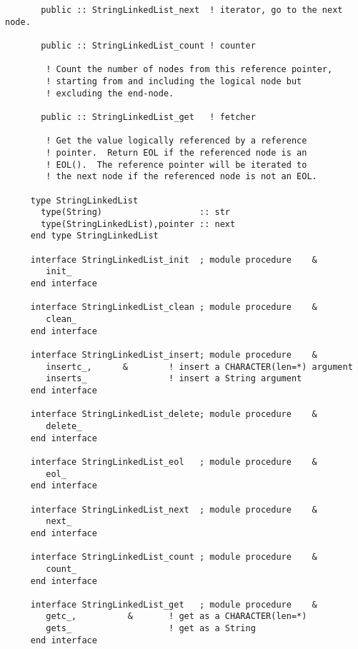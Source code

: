 \begin{verbatim}
       public :: StringLinkedList_next	! iterator, go to the next node.
 
       public :: StringLinkedList_count	! counter
       
 		! Count the number of nodes from this reference pointer,
 		! starting from and including the logical node but
 		! excluding the end-node.
 
       public :: StringLinkedList_get	! fetcher
 
 		! Get the value logically referenced by a reference
 		! pointer.  Return EOL if the referenced node is an
 		! EOL().  The reference pointer will be iterated to
 		! the next node if the referenced node is not an EOL.
 
     type StringLinkedList
       type(String)                   :: str
       type(StringLinkedList),pointer :: next
     end type StringLinkedList
 
     interface StringLinkedList_init  ; module procedure	&
        init_
     end interface
 
     interface StringLinkedList_clean ; module procedure	&
        clean_
     end interface
 
     interface StringLinkedList_insert; module procedure	&
        insertc_,      &        ! insert a CHARACTER(len=*) argument
        inserts_                ! insert a String argument
     end interface
 
     interface StringLinkedList_delete; module procedure	&
        delete_
     end interface
 
     interface StringLinkedList_eol   ; module procedure	&
        eol_
     end interface
 
     interface StringLinkedList_next  ; module procedure	&
        next_
     end interface
 
     interface StringLinkedList_count ; module procedure	&
        count_
     end interface
 
     interface StringLinkedList_get   ; module procedure	&
        getc_,          &       ! get as a CHARACTER(len=*)
        gets_                   ! get as a String
     end interface
 \end{verbatim}%
 
 
